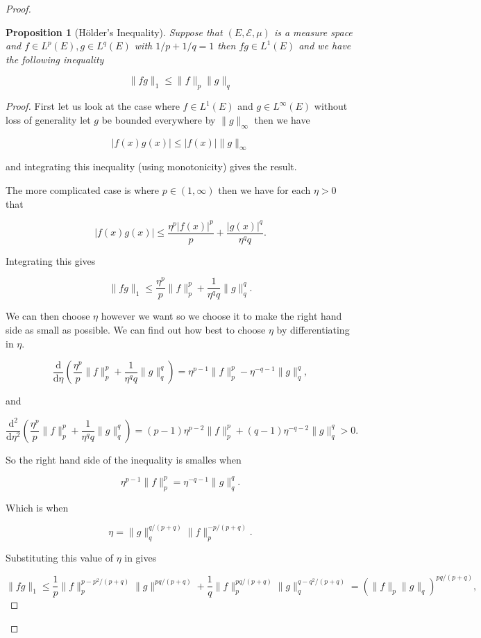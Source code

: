 \documentclass[
]{book}
\newtheorem{proposition}{Proposition}[chapter]
\theoremstyle{definition}
\theoremstyle{definition}
\theoremstyle{definition}
\theoremstyle{definition}
\theoremstyle{remark}
\begin{document}
\begin{proof}
\begin{proposition}[Hölder's Inequality]
Suppose that \((E, \mathcal{E}, \mu)\) is a measure space and \(f \in L^p(E), g \in L^q(E)\) with \(1/p+1/q =1\) then \(fg \in L^1(E)\) and we have the following inequality

\[ \|fg\|_1 \leq  \|f\|_p \|g\|_q \]
\end{proposition}

\begin{proof}
First let us look at the case where \(f \in L^1(E)\) and \(g \in L^\infty(E)\) without loss of generality let \(g\) be bounded everywhere by \(\|g\|_\infty\) then we have

\[ |f(x)g(x)| \leq |f(x)| \|g\|_\infty \]

and integrating this inequality (using monotonicity) gives the result.

The more complicated case is where \(p \in (1, \infty)\) then we have for each \(\eta >0\) that

\[ |f(x)g(x)| \leq \frac{\eta^p |f(x)|^p}{p} + \frac{|g(x)|^q}{\eta^q q}. \]

Integrating this gives

\[ \|fg\|_1 \leq \frac{\eta^p}{p} \|f\|_p^p + \frac{1}{\eta^q q} \|g\|_q^q. \]

We can then choose \(\eta\) however we want so we choose it to make the right hand side as small as possible. We can find out how best to choose \(\eta\) by differentiating in \(\eta\).

\[ \frac{\mathrm{d}}{\mathrm{d}\eta} \left(\frac{\eta^p}{p} \|f\|_p^p + \frac{1}{\eta^q q} \|g\|_q^q\right) = \eta^{p-1} \|f\|_p^p - \eta^{-q-1} \|g\|_q^q, \]

and

\[ \frac{\mathrm{d}^2}{\mathrm{d}\eta^2} \left(\frac{\eta^p}{p} \|f\|_p^p + \frac{1}{\eta^q q} \|g\|_q^q\right) = (p-1) \eta^{p-2} \|f\|_p^p + (q-1) \eta^{-q-2} \|g\|_q^q>0.\]

So the right hand side of the inequality is smalles when

\[ \eta^{p-1} \|f\|_p^p = \eta^{-q-1} \|g\|_q^q.  \]

Which is when

\[ \eta = \|g\|_q^{q/(p+q)} \|f\|_p^{-p/(p+q)}. \]

Substituting this value of \(\eta\) in gives

\[ \|fg\|_1 \leq \frac{1}{p} \|f\|_p^{p-p^2/(p+q)} \|g\|^{pq/(p+q)} + \frac{1}{q} \|f\|^{pq/(p+q)}_p \|g\|_q^{q-q^2/(p+q)} = \left(\|f\|_p \|g\|_q \right)^{pq/(p+q)},\]


\end{proof}
\end{proof}
\end{document}
